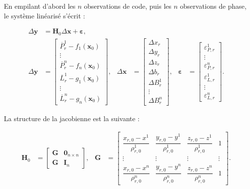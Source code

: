 En empilant d'abord les $n$ observations de code, puis les $n$ observations de
phase, le système linéarisé s'écrit :

\begin{align}
\Delta\mathbf y
&=
\mathbf H_0\Delta\mathbf x+\boldsymbol\varepsilon,
\label{ann:eq:stacked_linearized_system}
\\
\Delta\mathbf y
&=
\begin{bmatrix}
\overline P_r^1-f_1(\mathbf x_0)\\
\vdots\\
\overline P_r^n-f_n(\mathbf x_0)\\
\overline L_r^1-g_1(\mathbf x_0)\\
\vdots\\
\overline L_r^n-g_n(\mathbf x_0)
\end{bmatrix},
&
\Delta\mathbf x
&=
\begin{bmatrix}
\Delta x_r\\
\Delta y_r\\
\Delta z_r\\
\Delta b_r\\
\Delta B_r^1\\
\vdots\\
\Delta B_r^n
\end{bmatrix},
&
\boldsymbol\varepsilon
&=
\begin{bmatrix}
\varepsilon_{P,r}^1\\
\vdots\\
\varepsilon_{P,r}^n\\
\varepsilon_{L,r}^1\\
\vdots\\
\varepsilon_{L,r}^n
\end{bmatrix}.
\label{ann:eq:stacked_vectors}
\end{align}


La structure de la jacobienne est la suivante :

\begin{align}
\mathbf H_0
&=
\begin{bmatrix}
\mathbf G & \mathbf 0_{n\times n}\\
\mathbf G & \mathbf I_n
\end{bmatrix},
&
\mathbf G
&=
\begin{bmatrix}
\dfrac{x_{r,0}-x^1}{\rho_{r,0}^1} &
\dfrac{y_{r,0}-y^1}{\rho_{r,0}^1} &
\dfrac{z_{r,0}-z^1}{\rho_{r,0}^1} & 1\\
\vdots & \vdots & \vdots & \vdots\\
\dfrac{x_{r,0}-x^n}{\rho_{r,0}^n} &
\dfrac{y_{r,0}-y^n}{\rho_{r,0}^n} &
\dfrac{z_{r,0}-z^n}{\rho_{r,0}^n} & 1
\end{bmatrix}.
\label{ann:eq:gnss_design_matrix}
\end{align}

